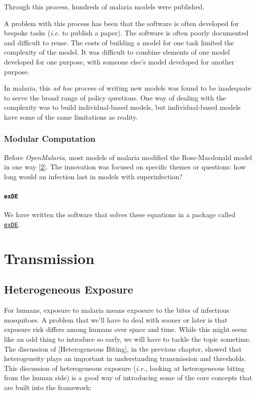 \documentclass[
]{book}
\begin{document}
Through this process, hundreds of malaria models were published.

A problem with this process has been that the software is often developed for bespoke tasks (\emph{i.e.} to publish a paper). The software is often poorly documented and difficult to reuse. The costs of building a model for one task limited the complexity of the model. It was difficult to combine elements of one model developed for one purpose, with someone else's model developed for another purpose.

In malaria, this \emph{ad hoc} process of writing new models was found to be inadequate to serve the broad range of policy questions. One way of dealing with the complexity was to build individual-based models, but individual-based models have some of the same limitations as reality.

\hypertarget{modular-computation}{%
\section{Modular Computation}\label{modular-computation}}

Before \emph{OpenMalaria}, most models of malaria modified the Ross-Macdonald model in one way {[}\protect\hyperlink{ref-ReinerRCJ2013SystematicReview}{2}{]}. The innovation was focused on specific themes or questions: how long would an infection last in models with superinfection?

\hypertarget{exde}{%
\subsection{\texorpdfstring{\texttt{exDE}}{exDE}}\label{exde}}

We have written the software that solves these equations in a package called \href{https://cran.r-project.org/web/packages/exDE/index.html}{\texttt{exDE}}.

\hypertarget{part-transmission}{%
\part{Transmission}\label{part-transmission}}

\hypertarget{heterogeneous-exposure}{%
\chapter{Heterogeneous Exposure}\label{heterogeneous-exposure}}

For humans, exposure to malaria means exposure to the bites of infectious mosquitoes. A problem that we'll have to deal with sooner or later is that exposure risk differs among humans over space and time. While this might seem like an odd thing to introduce so early, we will have to tackle the topic sometime. The discussion of {[}Heterogeneous Biting{]}, in the previous chapter, showed that heterogeneity plays an important in understanding transmission and thresholds. This discussion of heterogeneous exposure (\emph{i.e.}, looking at heterogeneous biting from the human side) is a good way of introducing some of the core concepts that are built into the framework:
\end{document}

